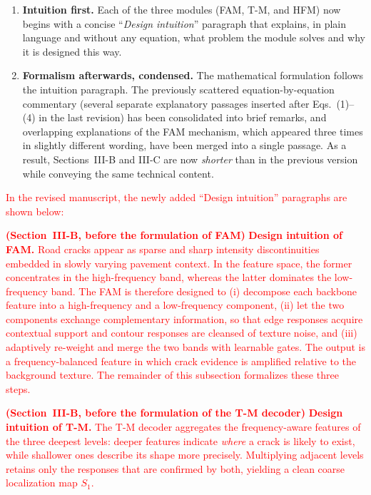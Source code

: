 \documentclass[lettersize,journal,onecolumn,12pt]{IEEEtran}
\begin{document}
\begin{enumerate}
    \item \textbf{Intuition first.} Each of the three modules (FAM, T-M, and HFM) now begins with a concise
    ``\emph{Design intuition}'' paragraph that explains, in plain language and without any equation, what problem the
    module solves and why it is designed this way.

    \item \textbf{Formalism afterwards, condensed.} The mathematical formulation follows the intuition paragraph.
    The previously scattered equation-by-equation commentary (several separate explanatory passages inserted after
    Eqs.~(1)--(4) in the last revision) has been consolidated into brief remarks, and overlapping explanations of the
    FAM mechanism, which appeared three times in slightly different wording, have been merged into a single passage.
    As a result, Sections~III-B and III-C are now \emph{shorter} than in the previous version while conveying the
    same technical content.
\end{enumerate}

\textcolor{red}{In the revised manuscript, the newly added ``Design intuition'' paragraphs are shown below:}

\textcolor{red}{
\textbf{(Section~III-B, before the formulation of FAM)}
\textbf{Design intuition of FAM.} Road cracks appear as sparse and sharp intensity discontinuities embedded in slowly
varying pavement context. In the feature space, the former concentrates in the high-frequency band, whereas the
latter dominates the low-frequency band. The FAM is therefore designed to (i) decompose each backbone feature into a
high-frequency and a low-frequency component, (ii) let the two components exchange complementary information, so that
edge responses acquire contextual support and contour responses are cleansed of texture noise, and (iii) adaptively
re-weight and merge the two bands with learnable gates. The output is a frequency-balanced feature in which crack
evidence is amplified relative to the background texture. The remainder of this subsection formalizes these three
steps.
}

\textcolor{red}{
\textbf{(Section~III-B, before the formulation of the T-M decoder)}
\textbf{Design intuition of T-M.} The T-M decoder aggregates the frequency-aware features of the three deepest
levels: deeper features indicate \emph{where} a crack is likely to exist, while shallower ones describe its shape
more precisely. Multiplying adjacent levels retains only the responses that are confirmed by both, yielding a clean
coarse localization map $S_1$.
}
\end{document}
